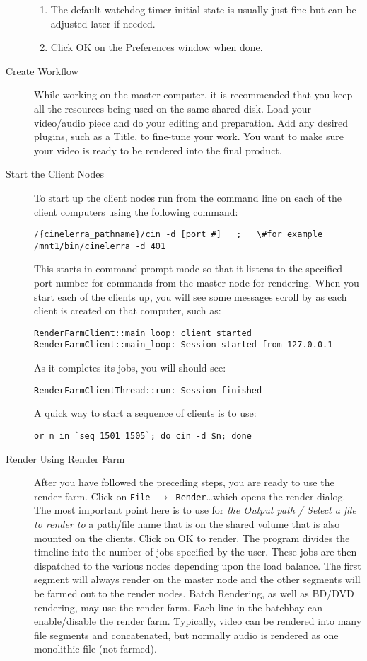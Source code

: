 \begin{description}
\begin{enumerate}
        \item The default watchdog timer initial state is usually just fine but can be adjusted later if needed.
        \item Click OK on the Preferences window when done.
    \end{enumerate}
    \item[Create Workflow] While working on the master computer, it is recommended that you keep all the resources being used on the same shared disk.  Load your video/audio piece and do your editing and preparation.  Add any desired plugins, such as a Title, to fine-tune your work.  You want to make sure your video is ready to be rendered into the final product.
    \item[Start the Client Nodes] To start up the client nodes run \CGG{} from the command line on each of the client computers using the following command:
    \begin{lstlisting}[style=sh]
/{cinelerra_pathname}/cin -d [port #]   ;   \#for example /mnt1/bin/cinelerra -d 401
    \end{lstlisting}
    This starts \CGG{} in command prompt mode so that it listens to the specified port number for commands from the master node for rendering.  When you start each of the clients up, you will see some messages scroll by as each client is created on that computer, such as:
    \begin{lstlisting}[style=sh]
RenderFarmClient::main_loop: client started
RenderFarmClient::main_loop: Session started from 127.0.0.1
    \end{lstlisting}
    As it completes its jobs, you will should see:
    \begin{lstlisting}[style=sh]
RenderFarmClientThread::run: Session finished
    \end{lstlisting}
    A quick way to start a sequence of clients is to use:
    \begin{lstlisting}[style=sh]
or n in `seq 1501 1505`; do cin -d $n; done
    \end{lstlisting}
    \item[Render Using Render Farm] After you have followed the preceding steps, you are ready to use the render farm.  Click on \texttt{File $\rightarrow$ Render}\dots which opens the render dialog.  The most important point here is to use for \textit{the Output path / Select a file to render to} a path/file name that is on the shared volume that is also mounted on the clients.  Click on OK to render. The \CGG{} program divides the timeline into the number of jobs specified by the user.  These jobs are then dispatched to the various nodes depending upon the load balance. The first segment will always render on the master node and the other segments will be farmed out to the render nodes.  Batch Rendering, as well as BD/DVD rendering, may use the render farm.  Each line in the batchbay can enable/disable the render farm.  Typically, video can be rendered into many file segments and concatenated, but normally audio is rendered as one monolithic file (not farmed).


\end{description}
